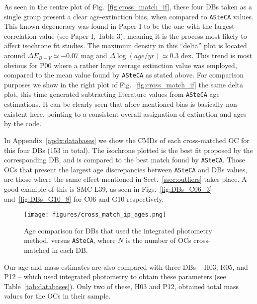 \documentclass[a4paper,fleqn,usenatbib]{mnras}
\begin{document}
%
As seen in the centre plot of Fig.~\ref{fig:cross_match_if}, these four DBs
taken as a single group present a clear age-extinction bias, when compared
to \texttt{ASteCA} values. This known degeneracy was found in Paper I to be
the one with the largest correlation value (see Paper I, Table 3), meaning it is
the process most likely to affect isochrone fit studies.
The maximum density in this ``delta'' plot is located around
$\Delta E_{B-V}{\simeq-}0.07$ mag and $\Delta \log(age/yr){\simeq}0.3$ dex.
This trend is most obvious for P00 where a rather large average extinction
value was employed, compared to the mean value found by \texttt{ASteCA} as
stated above.
%
For comparison purposes we show in the right plot of
Fig.~\ref{fig:cross_match_if} the same delta plot, this time generated
subtracting literature values from \texttt{ASteCA} age estimations. It can 
be clearly seen that afore mentioned bias is basically non-existent here,
pointing to a consistent overall assignation of extinction and ages by
the code.

In Appendix~\ref{apdx:databases} we show the CMDs of each cross-matched OC for
this four DBs (153 in total). The isochrone plotted is the best fit proposed by
the corresponding DB, and is compared to the best match found by
\texttt{ASteCA}.
Those OCs that present the largest age discrepancies between \texttt{ASteCA} and
DBs values, are those where the same effect mentioned in
Sect.~\ref{ssec:outliers} takes place. A good example of this is SMC-L39, as
seen in Figs.~\ref{fig:DBs_C06_3} and~\ref{fig:DBs_G10_8} for C06 and G10
respectively.\\


%

\begin{figure}
\texttt{[image: figures/cross\_match\_ip\_ages.png]}
\caption{Age comparison for DBs that used the integrated photometry
method, versus \texttt{ASteCA}, where $N$ is the number of OCs cross-matched in
each DB.\@}
\label{fig:cross_match_ip_age}
\end{figure}

Our age and mass estimates are also compared with three DBs -- H03, R05, and P12
-- which used integrated photometry to obtain these parameters (see
Table~\ref{tab:databases}). Only two of these, H03 and P12, obtained total
mass values for the OCs in their sample.
\end{document}
